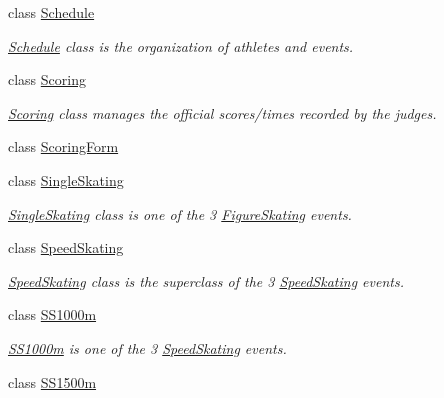 \begin{DoxyCompactItemize}
class \hyperlink{classProject__Codename__Olympia__v1_1_1__0_1_1Schedule}{Schedule}
\begin{DoxyCompactList}\small\item\em \hyperlink{classProject__Codename__Olympia__v1_1_1__0_1_1Schedule}{Schedule} class is the organization of athletes and events. \end{DoxyCompactList}\item 
class \hyperlink{classProject__Codename__Olympia__v1_1_1__0_1_1Scoring}{Scoring}
\begin{DoxyCompactList}\small\item\em \hyperlink{classProject__Codename__Olympia__v1_1_1__0_1_1Scoring}{Scoring} class manages the official scores/times recorded by the judges. \end{DoxyCompactList}\item 
class \hyperlink{classProject__Codename__Olympia__v1_1_1__0_1_1ScoringForm}{Scoring\+Form}
\item 
class \hyperlink{classProject__Codename__Olympia__v1_1_1__0_1_1SingleSkating}{Single\+Skating}
\begin{DoxyCompactList}\small\item\em \hyperlink{classProject__Codename__Olympia__v1_1_1__0_1_1SingleSkating}{Single\+Skating} class is one of the 3 \hyperlink{classProject__Codename__Olympia__v1_1_1__0_1_1FigureSkating}{Figure\+Skating} events. \end{DoxyCompactList}\item 
class \hyperlink{classProject__Codename__Olympia__v1_1_1__0_1_1SpeedSkating}{Speed\+Skating}
\begin{DoxyCompactList}\small\item\em \hyperlink{classProject__Codename__Olympia__v1_1_1__0_1_1SpeedSkating}{Speed\+Skating} class is the superclass of the 3 \hyperlink{classProject__Codename__Olympia__v1_1_1__0_1_1SpeedSkating}{Speed\+Skating} events. \end{DoxyCompactList}\item 
class \hyperlink{classProject__Codename__Olympia__v1_1_1__0_1_1SS1000m}{S\+S1000m}
\begin{DoxyCompactList}\small\item\em \hyperlink{classProject__Codename__Olympia__v1_1_1__0_1_1SS1000m}{S\+S1000m} is one of the 3 \hyperlink{classProject__Codename__Olympia__v1_1_1__0_1_1SpeedSkating}{Speed\+Skating} events. \end{DoxyCompactList}\item 
class \hyperlink{classProject__Codename__Olympia__v1_1_1__0_1_1SS1500m}{S\+S1500m}

\end{DoxyCompactItemize}
